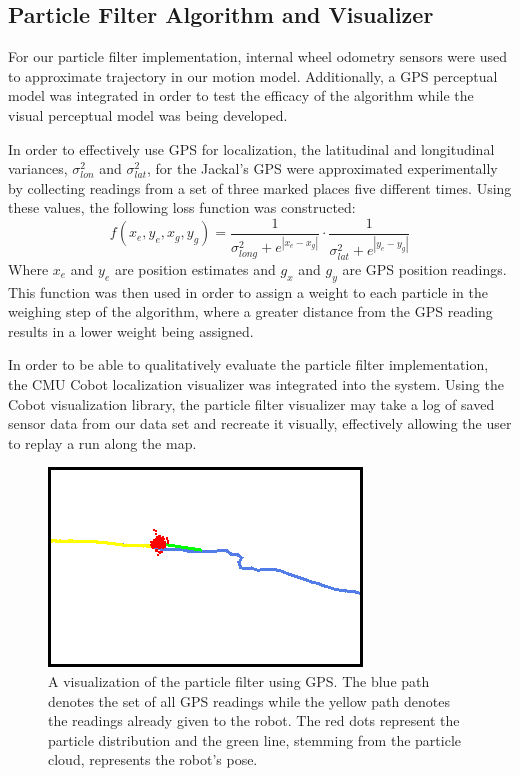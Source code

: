 \documentclass[letterpaper, 12 pt, conference]{ieeeconf}  %
\begin{document}
\subsection{Particle Filter Algorithm and Visualizer}
For our particle filter implementation, internal wheel odometry sensors were used to approximate trajectory in our motion model. Additionally, a GPS perceptual model was integrated in order to test the efficacy of the algorithm while the visual perceptual model was being developed. 
\par
In order to effectively use GPS for localization, the latitudinal and longitudinal variances, $\sigma _{lon}^2$ and $\sigma _{lat}^2$, for the Jackal's GPS were approximated experimentally by collecting readings from a set of three marked places five different times. Using these values, the following loss function was constructed:
$$
f(x_e,y_e,x_g,y_g)= \frac{1}{\sigma _{long}^2 + e^{|x_e-x_g|}}\cdot \frac{1}{\sigma _{lat}^2 + e^{|y_e-y_g|}}
$$
Where $x_e$ and $y_e$ are position estimates and $g_x$ and $g_y$ are GPS position readings. This function was then used in order to assign a weight to each particle in the weighing step of the algorithm, where a greater distance from the GPS reading results in a lower weight being assigned.
\par
In order to be able to qualitatively evaluate the particle filter implementation, the CMU Cobot \cite{cobot} localization visualizer was integrated into the system. Using the Cobot visualization library, the particle filter visualizer may take a log of saved sensor data from our data set and recreate it visually, effectively allowing the user to replay a run along the map. 

\begin{figure}[h]
\centering
\includegraphics[scale=0.70]{particle_filter_visual}
\caption{A visualization of the particle filter using GPS. The blue path denotes the set of all GPS readings while the yellow path denotes the readings already given to the robot. The red dots represent the particle distribution and the green line, stemming from the particle cloud, represents the robot's pose.}
\end{figure}
\end{document}
